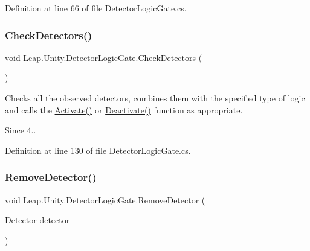 Definition at line 66 of file Detector\+Logic\+Gate.\+cs.

\mbox{\label{class_leap_1_1_unity_1_1_detector_logic_gate_ad2a29c15734f53978d2ba432cbcec9c1}} 
\subsubsection{\texorpdfstring{CheckDetectors()}{CheckDetectors()}}
{\footnotesize\ttfamily void Leap.\+Unity.\+Detector\+Logic\+Gate.\+Check\+Detectors (\begin{DoxyParamCaption}{ }\end{DoxyParamCaption})\hspace{0.3cm}{\ttfamily [protected]}}

Checks all the observed detectors, combines them with the specified type of logic and calls the \mbox{\hyperlink{class_leap_1_1_unity_1_1_detector_aed8730358778949381639d53df61aac8}{Activate()}} or \mbox{\hyperlink{class_leap_1_1_unity_1_1_detector_a6493874fd22793d7b59dc56098559d59}{Deactivate()}} function as appropriate. \begin{DoxySince}{Since}
4.. 
\end{DoxySince}


Definition at line 130 of file Detector\+Logic\+Gate.\+cs.

\mbox{\label{class_leap_1_1_unity_1_1_detector_logic_gate_a91e6fa77ae70a62f92afd1016b0d738e}} 
\subsubsection{\texorpdfstring{RemoveDetector()}{RemoveDetector()}}
{\footnotesize\ttfamily void Leap.\+Unity.\+Detector\+Logic\+Gate.\+Remove\+Detector (\begin{DoxyParamCaption}\item[{\mbox{\hyperlink{class_leap_1_1_unity_1_1_detector}{Detector}}}]{detector }\end{DoxyParamCaption})}

